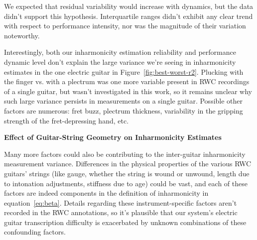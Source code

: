 \documentclass[12pt]{cmuthesis}
\begin{document}
We expected that residual variability would increase with dynamics, but the data didn't support this hypothesis. Interquartile ranges didn't exhibit any clear trend with respect to performance intensity, nor was the magnitude of their variation noteworthy. 

Interestingly, both our inharmonicity estimation reliability and performance dynamic level don't explain the large variance we're seeing in inharmonicity estimates in the one electric guitar in Figure~\ref{fig:best-worst-r2}. Plucking with the finger vs. with a plectrum was one more variable present in RWC recordings of a single guitar, but wasn't investigated in this work, so it remains unclear why such large variance persists in measurements on a single guitar. Possible other factors are numerous: fret buzz, plectrum thickness, variability in the gripping strength of the fret-depressing hand, etc.

\textbf{Effect of Guitar-String Geometry on Inharmonicity Estimates}

Many more factors could also be contributing to the inter-guitar inharmonicity measurement variance. Differences in the physical properties of the various RWC guitars' strings (like gauge, whether the string is wound or unwound, length due to intonation adjustments, stiffness due to age) could be vast, and each of these factors are indeed components in the definition of inharmonicity in equation~\eqref{eq:beta}. Details regarding these instrument-specific factors aren't recorded in the RWC annotations, so it's plausible that our system's electric guitar transcription difficulty is exacerbated by unknown combinations of these confounding factors. 
\end{document}
